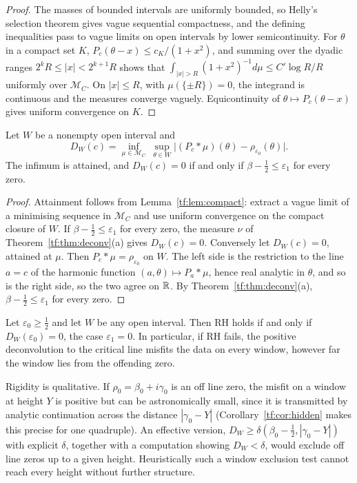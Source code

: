 \begin{proof}
The masses of bounded intervals are uniformly bounded, so Helly's selection theorem gives vague sequential compactness, and the defining inequalities pass to vague limits on open intervals by lower semicontinuity. For $\theta$ in a compact set $K$, $P_c(\theta-x)\le c_K/(1+x^2)$, and summing over the dyadic ranges $2^kR\le|x|<2^{k+1}R$ shows that $\int_{|x|>R}(1+x^2)^{-1}d\mu\le C'\log R/R$ uniformly over $\mathcal M_C$. On $|x|\le R$, with $\mu(\{\pm R\})=0$, the integrand is continuous and the measures converge vaguely. Equicontinuity of $\theta\mapsto P_c(\theta-x)$ gives uniform convergence on $K$.
\end{proof}

\begin{theorem}\label{tf:thm:rigid}
Let $W$ be a nonempty open interval and
\[
D_W(c)=\inf_{\mu\in\mathcal M_C}\ \sup_{\theta\in W}\bigl|(P_c*\mu)(\theta)-\rho_{\varepsilon_0}(\theta)\bigr|.
\]
The infimum is attained, and $D_W(c)=0$ if and only if $\beta-\tfrac12\le\varepsilon_1$ for every zero.
\end{theorem}

\begin{proof}
Attainment follows from Lemma~\ref{tf:lem:compact}: extract a vague limit of a minimising sequence in $\mathcal M_C$ and use uniform convergence on the compact closure of $W$. If $\beta-\tfrac12\le\varepsilon_1$ for every zero, the measure $\nu$ of Theorem~\ref{tf:thm:deconv}(a) gives $D_W(c)=0$. Conversely let $D_W(c)=0$, attained at $\mu$. Then $P_c*\mu=\rho_{\varepsilon_0}$ on $W$. The left side is the restriction to the line $a=c$ of the harmonic function $(a,\theta)\mapsto P_a*\mu$, hence real analytic in $\theta$, and so is the right side, so the two agree on $\mathbb{R}$. By Theorem~\ref{tf:thm:deconv}(a), $\beta-\tfrac12\le\varepsilon_1$ for every zero.
\end{proof}

\begin{corollary}\label{tf:cor:window}
Let $\varepsilon_0\ge\tfrac12$ and let $W$ be any open interval. Then RH holds if and only if $D_W(\varepsilon_0)=0$, the case $\varepsilon_1=0$. In particular, if RH fails, the positive deconvolution to the critical line misfits the data on every window, however far the window lies from the offending zero.
\end{corollary}

\begin{remark}\label{tf:rem:window}
Rigidity is qualitative. If $\rho_0=\beta_0+i\gamma_0$ is an off line zero, the misfit on a window at height $Y$ is positive but can be astronomically small, since it is transmitted by analytic continuation across the distance $|\gamma_0-Y|$ (Corollary~\ref{tf:cor:hidden} makes this precise for one quadruple). An effective version, $D_W\ge\delta(\beta_0-\tfrac12,|\gamma_0-Y|)$ with explicit $\delta$, together with a computation showing $D_W<\delta$, would exclude off line zeros up to a given height. Heuristically such a window exclusion test cannot reach every height without further structure.
\end{remark}

